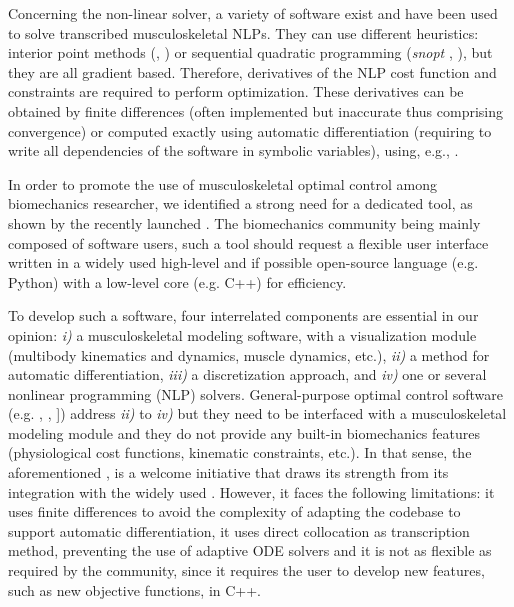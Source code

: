 Concerning the non-linear solver, a variety of software exist and have been used to solve transcribed musculoskeletal NLPs.
They can use different heuristics: interior point methods (\ipopt, \cite{wachter2006implementation}) or sequential quadratic programming (\textit{snopt} \cite{gill2005snopt}, \acados \cite{verschueren2018towards}), but they are all gradient based.
Therefore, derivatives of the NLP cost function and constraints are required to perform optimization.
These derivatives can be obtained by finite differences (often implemented but inaccurate thus comprising convergence) or computed exactly using automatic differentiation (requiring to write all dependencies of the software in symbolic variables), using, e.g., \casadi \cite{andersson2019casadi}.

In order to promote the use of musculoskeletal optimal control among biomechanics researcher, we identified a strong need for a dedicated tool, as shown by the recently launched \moco \cite{dembia2020opensim}. 
The biomechanics community being mainly composed of software users, such a tool should request a flexible user interface written in a widely used high-level and if possible open-source language (e.g. Python) with a low-level core (e.g. C++) for efficiency. 

To develop such a software, four interrelated components are essential in our opinion: \textit{i)} a musculoskeletal modeling software, with a visualization module (multibody kinematics and dynamics, muscle dynamics, etc.), \textit{ii)} a method for automatic differentiation, \textit{iii)} a discretization approach, and \textit{iv)} one or several nonlinear programming (NLP) solvers. 
General-purpose optimal control software (e.g. \gpopsii \cite{patterson2014gpops}, \muscodii \cite{leineweber2003efficient1,leineweber2003efficient2}, \acado \cite{houska2011acado}]) address \textit{ii)} to \textit{iv)} but they need to be interfaced with a musculoskeletal modeling module and they do not provide any built-in biomechanics features (physiological cost functions, kinematic constraints, etc.). 
In that sense, the aforementioned \moco, is a welcome initiative that draws its strength from its integration with the widely used \opensim.
However, it faces the following limitations: it uses finite differences to avoid the complexity of adapting the \opensim codebase to support automatic differentiation, it uses direct collocation as transcription method, preventing the use of adaptive ODE solvers and it is not as flexible as required by the community, since it requires the user to develop new features, such as new objective functions, in C++.\\
\newpage

